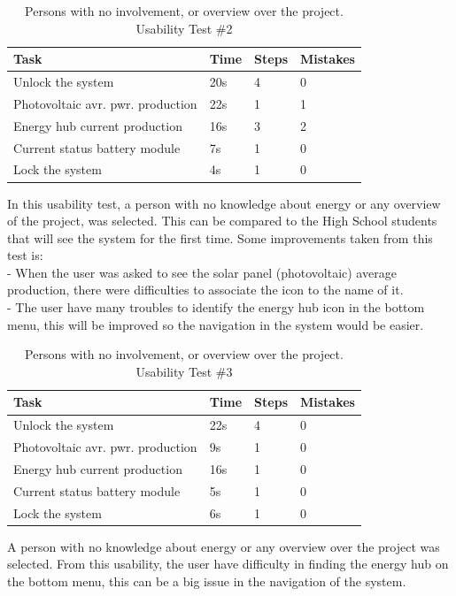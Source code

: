 \begin{table}[H]
	\begin{tabular}{ | l | l | l | l |}
		\hline
		Task 					     & 		Time 	& 	Steps 	&	 Mistakes \\ \hline
		Unlock the system 			     & 		20s 		&	 4 		& 		0 	\\ \hline
		Photovoltaic avr. pwr. production  & 		22s 		& 	 1 		& 		1 	\\ \hline
		Energy hub current production 	     & 		16s 		& 	 3 		& 		2 	\\ \hline
		Current status battery module 	     & 		7s 		& 	 1 		& 		0 	\\ \hline
		Lock the system 			     & 		4s 		& 	 1 		& 		0 	\\ \hline
	\end{tabular}
     \caption{Persons with no involvement, or overview over the project. Usability Test \#2}
\end{table}
In this usability test, a person with no knowledge about energy or any overview of the project, was selected. This can be compared to the High School students that will see the system for the first time.\p
Some improvements taken from this test is:\\
- When the user was asked to see the solar panel (photovoltaic) average production, there were difficulties to associate the icon to the name of it.\\
- The user have many troubles to identify the energy hub icon in the bottom menu, this will be improved so the navigation in the system would be easier.\\

\begin{table}[H]
	\begin{tabular}{ | l | l | l | l |}
		\hline
		Task 					      & 	Time 	& 	Steps 	& 	Mistakes  \\ \hline
		Unlock the system 			      & 	22s 		& 	4 		& 	0 		\\ \hline
		Photovoltaic avr. pwr. production   & 	9s 		& 	1 		& 	0 		\\ \hline
		Energy hub current production 	      & 	16s 		& 	1 		& 	0 		\\ \hline
		Current status battery module 	      & 	5s 		& 	1 		& 	0 		\\ \hline
		Lock the system 			      & 	6s 		& 	1 		& 	0		\\ \hline
	\end{tabular}
    \caption{Persons with no involvement, or overview over the project. Usability Test \#3}
\end{table}
A person with no knowledge about energy or any overview over the project was selected. From this usability, the user have difficulty in finding the energy hub on the bottom menu, this can be a big issue in the navigation of the system. \p

